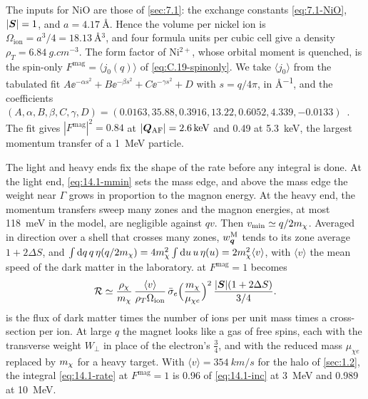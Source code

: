 The inputs for NiO are those of \cref{sec:7.1}: the exchange constants \cref{eq:7.1-NiO}, $|\bm{S}| = 1$, and $a = \SI{4.17}{\angstrom}$. Hence the volume per nickel ion is $\Omega_{\mathrm{ion}} = a^3/4 = \SI{18.13}{\angstrom^3}$, and four formula units per cubic cell give a density $\rho_T = \SI{6.84}{g.cm^{-3}}$. The form factor of Ni$^{2+}$, whose orbital moment is quenched, is the spin-only $F^{\mathrm{mag}} = \langle j_0(q)\rangle$ of \cref{eq:C.19-spinonly}. We take $\langle j_0\rangle$ from the tabulated fit $A\ee^{-\alpha s^2} + B\ee^{-\beta s^2} + C\ee^{-\gamma s^2} + D$ with $s = q/4\pi$, in \si{\angstrom^{-1}}, and the coefficients $(A, \alpha, B, \beta, C, \gamma, D) = (0.0163, 35.88, 0.3916, 13.22, 0.6052, 4.339, -0.0133)$~\cite[Sect.~4.4.5, Table~4.4.5.2]{anderson2006neutron}. The fit gives $|F^{\mathrm{mag}}|^2 = 0.84$ at $|\bm{Q}_{\mathrm{AF}}| = \SI{2.6}{keV}$ and 0.49 at \SI{5.3}{keV}, the largest momentum transfer of a \SI{1}{MeV} particle.

The light and heavy ends fix the shape of the rate before any integral is done. At the light end, \cref{eq:14.1-mmin} sets the mass edge, and above the mass edge the weight near $\Gamma$ grows in proportion to the magnon energy. At the heavy end, the momentum transfers sweep many zones and the magnon energies, at most \SI{118}{meV} in the model, are negligible against $qv$. Then $v_{\mathrm{min}} \simeq q/2m_{\chi}$. Averaged in direction over a shell that crosses many zones, $w^{\mathrm{M}}_{\bm{q}}$ tends to its zone average $1 + 2\Delta S$, and $\int\mathrm{d} q\,q\,\eta(q/2m_{\chi}) = 4m_{\chi}^2\int\mathrm{d} u\,u\,\eta(u) = 2m_{\chi}^2\langle v\rangle$, with $\langle v\rangle$ the mean speed of the dark matter in the laboratory.  at $F^{\mathrm{mag}} = 1$ becomes
\begin{equation}
  \mathcal{R} \simeq \frac{\rho_\chi}{m_{\chi}}\,\frac{\langle v\rangle}{\rho_T\Omega_{\mathrm{ion}}}\,\bar{\sigma}_{e}\Bigl(\frac{m_{\chi}}{\mu_{\chi e}}\Bigr)^2\,\frac{|\bm{S}|(1 + 2\Delta S)}{3/4} .
  \label{eq:14.1-inc}
\end{equation}
 is the flux of dark matter times the number of ions per unit mass times a cross-section per ion. At large $q$ the magnet looks like a gas of free spins, each with the transverse weight $W_\perp$ in place of the electron's $\frac34$, and with the reduced mass $\mu_{\chi e}$ replaced by $m_{\chi}$ for a heavy target. With $\langle v\rangle = \SI{354}{km/s}$ for the halo of \cref{sec:1.2}, the integral \cref{eq:14.1-rate} at $F^{\mathrm{mag}} = 1$ is 0.96 of \cref{eq:14.1-inc} at \SI{3}{MeV} and 0.989 at \SI{10}{MeV}.


